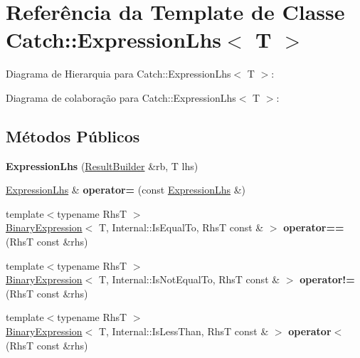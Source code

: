 \hypertarget{classCatch_1_1ExpressionLhs}{}\section{Referência da Template de Classe Catch\+:\+:Expression\+Lhs$<$ T $>$}
\label{classCatch_1_1ExpressionLhs}


Diagrama de Hierarquia para Catch\+:\+:Expression\+Lhs$<$ T $>$\+:


Diagrama de colaboração para Catch\+:\+:Expression\+Lhs$<$ T $>$\+:
\subsection*{Métodos Públicos}
\begin{DoxyCompactItemize}
\item 
{\bfseries Expression\+Lhs} (\hyperlink{classCatch_1_1ResultBuilder}{Result\+Builder} \&rb, T lhs)\hypertarget{classCatch_1_1ExpressionLhs_aa829588def6146a94fb75de9c4cc482a}{}\label{classCatch_1_1ExpressionLhs_aa829588def6146a94fb75de9c4cc482a}

\item 
\hyperlink{classCatch_1_1ExpressionLhs}{Expression\+Lhs} \& {\bfseries operator=} (const \hyperlink{classCatch_1_1ExpressionLhs}{Expression\+Lhs} \&)\hypertarget{classCatch_1_1ExpressionLhs_a60d50fe8adcaabcb7c93747ddbae5993}{}\label{classCatch_1_1ExpressionLhs_a60d50fe8adcaabcb7c93747ddbae5993}

\item 
{\footnotesize template$<$typename RhsT $>$ }\\\hyperlink{classCatch_1_1BinaryExpression}{Binary\+Expression}$<$ T, Internal\+::\+Is\+Equal\+To, RhsT const \& $>$ {\bfseries operator==} (RhsT const \&rhs)\hypertarget{classCatch_1_1ExpressionLhs_abebe4afc079c91ae548ab8fdba6c77f2}{}\label{classCatch_1_1ExpressionLhs_abebe4afc079c91ae548ab8fdba6c77f2}

\item 
{\footnotesize template$<$typename RhsT $>$ }\\\hyperlink{classCatch_1_1BinaryExpression}{Binary\+Expression}$<$ T, Internal\+::\+Is\+Not\+Equal\+To, RhsT const \& $>$ {\bfseries operator!=} (RhsT const \&rhs)\hypertarget{classCatch_1_1ExpressionLhs_a3bc08bb2b9c27678e2628faa73645144}{}\label{classCatch_1_1ExpressionLhs_a3bc08bb2b9c27678e2628faa73645144}

\item 
{\footnotesize template$<$typename RhsT $>$ }\\\hyperlink{classCatch_1_1BinaryExpression}{Binary\+Expression}$<$ T, Internal\+::\+Is\+Less\+Than, RhsT const \& $>$ {\bfseries operator$<$} (RhsT const \&rhs)\hypertarget{classCatch_1_1ExpressionLhs_a919c48e52ff1be5f7329920d4da8e92f}{}\label{classCatch_1_1ExpressionLhs_a919c48e52ff1be5f7329920d4da8e92f}


\end{DoxyCompactItemize}
